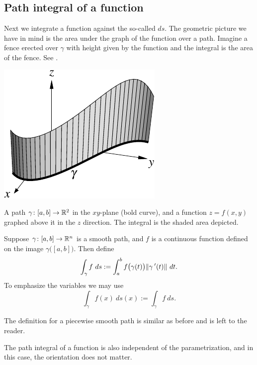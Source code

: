 \subsection{Path integral of a function}

Next we integrate a function against the so-called
\emph{} $ds$.  The geometric picture we have in mind
is the area under the graph of the function over a path.
Imagine a fence erected over $\gamma$ with height given by the function
and the integral is the area of the fence.
See .
\begin{myfigureht}
\includegraphics{figures/fenceintegral}
\caption{A path $\gamma \colon [a,b] \to {\mathbb{R}}^2$ in the $xy$-plane (bold curve), and a function
$z=f(x,y)$ graphed above it in the $z$ direction.  The integral is the
shaded area depicted.\label{fig:fenceintegral}}
\end{myfigureht}

\begin{defn}
Suppose $\gamma \colon [a,b] \to {\mathbb{R}}^n$ is a smooth path, and $f$ is a
continuous function defined on the image $\gamma\bigl([a,b]\bigr)$.  Then
define
\begin{equation*}
\int_{\gamma} f ~ds :=
\int_a^b f\bigl( \gamma(t) \bigr) \lVert {\gamma^{\:\prime}(t)} \rVert ~ dt .
\end{equation*}
To emphasize the variables we may use
\begin{equation*}
\int_{\gamma} f(x) ~ds(x) := \int_{\gamma} f ~ds .
\end{equation*}

The definition for a piecewise smooth path is similar as before and is left
to the reader.
\end{defn}

The path integral of a function is also independent of the parametrization,
and in this case, the orientation does not matter.

